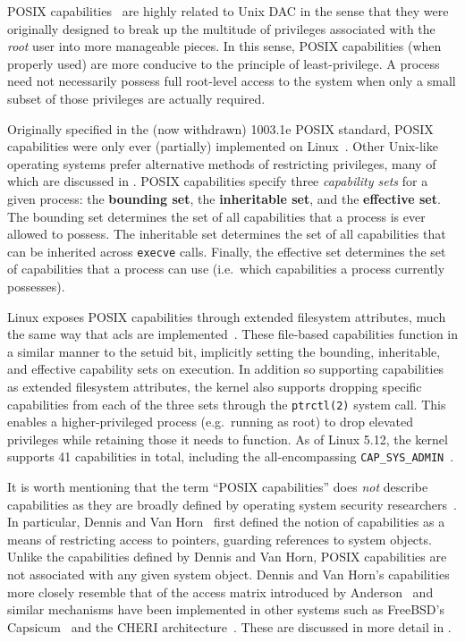 POSIX capabilities~\cite{posix_capabilities, corbet2006_capabities_a,
corbet2006_capabities_b} are highly related to Unix DAC in the sense that they were
originally designed to break up the multitude of privileges associated with the
\textit{root} user into more manageable pieces. In this sense, POSIX capabilities (when
properly used) are more conducive to the principle of least-privilege. A process need not
necessarily possess full root-level access to the system when only a small subset of those
privileges are actually required.

Originally specified in the (now withdrawn) 1003.1e POSIX standard, POSIX capabilities
were only ever (partially) implemented on Linux~\cite{anderson2017_comparison}. Other
Unix-like operating systems prefer alternative methods of restricting privileges, many of
which are discussed in . POSIX capabilities specify three
\textit{capability sets} for a given process: the \textbf{bounding set}, the
\textbf{inheritable set}, and the \textbf{effective set}. The bounding set determines the
set of all capabilities that a process is ever allowed to possess. The inheritable set
determines the set of all capabilities that can be inherited across \texttt{execve} calls.
Finally, the effective set determines the set of capabilities that a process can use
(i.e.~which capabilities a process currently possesses).

Linux exposes POSIX capabilities through extended filesystem attributes, much the same way
that \glspl{acl} are implemented~\cite{corbet2006_capabities_b}. These file-based
capabilities function in a similar manner to the setuid bit, implicitly setting the
bounding, inheritable, and effective capability sets on execution. In addition so
supporting capabilities as extended filesystem attributes, the kernel also supports
dropping specific capabilities from each of the three sets through the \texttt{ptrctl(2)}
system call. This enables a higher-privileged process (e.g.~running as root) to drop
elevated privileges while retaining those it needs to function. As of Linux 5.12, the
kernel supports 41 capabilities in total, including the all-encompassing
\texttt{CAP\_SYS\_ADMIN}~\cite{linux_capability_h}.

It is worth mentioning that the term \enquote{POSIX capabilities} does \textit{not}
describe capabilities as they are broadly defined by operating system security
researchers~\cite{anderson2017_comparison}. In particular, Dennis and Van
Horn~\cite{dennis1966_semantics} first defined the notion of capabilities as a means of
restricting access to pointers, guarding references to system objects. Unlike the
capabilities defined by Dennis and Van Horn, POSIX capabilities are not associated with
any given system object. Dennis and Van Horn's capabilities more closely resemble that of
the access matrix introduced by Anderson~\cite{anderson1972_report} and similar mechanisms
have been implemented in other systems such as FreeBSD's
Capsicum~\cite{watson2010_capsicum} and the CHERI architecture~\cite{watson2015_cheri,
davis2019_cheriabi}. These are discussed in more detail in .

